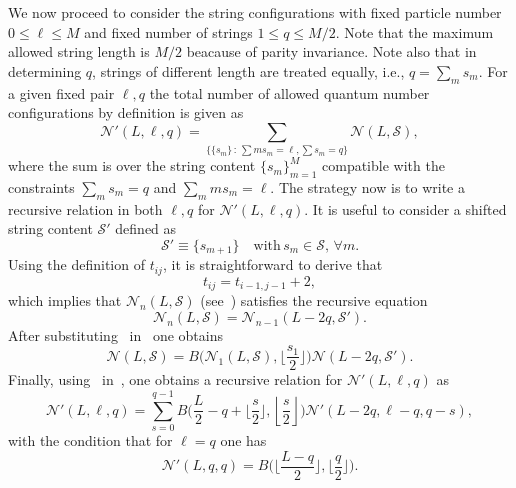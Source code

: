 \documentclass[11pt]{iopart}
\begin{document}
We now proceed to consider the string configurations with fixed particle number $0\le\ell
\le M$ and fixed number of strings $1\le q\le M/2$. Note that the maximum allowed string 
length is $M/2$ beacause of parity invariance. Note also that in determining $q$, strings 
of different length are treated equally, i.e., $q=\sum_m s_m$. For a given fixed pair 
$\ell,q$ the total number of allowed quantum number configurations by definition is given 
as 
%
\begin{equation}
\label{NLlq}
{\mathcal N}'(L,\ell,q)=\sum\limits_{\{\{s_m\}\,:\, \sum m s_m=\ell, \sum s_m=q\}}
{\mathcal N}(L,{\mathcal S}),
\end{equation}
%
where the sum is over the string content $\{s_m\}_{m=1}^M$ compatible with the constraints 
$\sum_m s_m=q$ and $\sum_m m s_m=\ell$. The strategy now is to write a recursive relation 
in both $\ell,q$ for ${\mathcal N}'(L,\ell,q)$. It is useful to consider a shifted string 
content ${\mathcal S}'$ defined as  
%
\begin{equation}
{\mathcal S}'\equiv \{s_{m+1}\}\quad\textrm{with}\, s_m\in{\mathcal S},\,\forall m.
\end{equation}
%
Using the definition of $t_{ij}$, it is straightforward to derive that  
%
\begin{equation}
t_{ij}=t_{i-1,j-1}+2,
\end{equation}
%
which implies that ${\mathcal N}_n(L,{\mathcal S})$ (see~) satisfies the 
recursive equation 
%
\begin{equation}
\label{inter}
{\mathcal N}_n(L,{\mathcal S})={\mathcal N}_{n-1}(L-2q,{\mathcal S}'). 
\end{equation}
%
After substituting~ in~ one obtains 
%
\begin{equation}
\label{NLSr}
{\mathcal N}(L,{\mathcal S})=B\Big({\mathcal N}_1(L,{\mathcal S}),\Big\lfloor 
\frac{s_1}{2}\Big\rfloor\Big){\mathcal N}(L-2q,{\mathcal S}'). 
\end{equation}
%
Finally, using~ in~, one obtains a recursive relation for 
${\mathcal N}'(L,\ell,q)$ as 
%
\begin{equation}
\label{NpLlq}
{\mathcal N}'(L,\ell,q)=\sum_{s=0}^{q-1}B\Big(\frac{L}{2}-q+\Big\lfloor
\frac{s}{2}\Big\rfloor,\left\lfloor\frac{s}{2}\right\rfloor\Big){\mathcal N}'
\left(L-2q,\ell-q,q-s\right), 
\end{equation}
%
with the condition that for $\ell=q$ one has 
%
\begin{equation}
{\mathcal N}'(L,q,q)=B\Big(\Big\lfloor\frac{L-q}{2}\Big\rfloor,\Big\lfloor
\frac{q}{2} \Big\rfloor\Big).
\end{equation}
\end{document}
